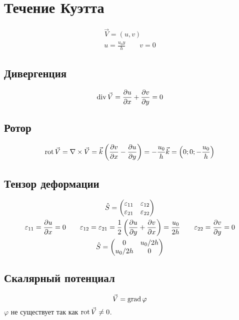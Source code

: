 \section{\texorpdfstring{Течение Куэтта}{Couette flow}}
\begin{gather*}
    \vec{V} = (u, v) \\
    u = \frac{u_0 y}{h} \qquad v = 0
\end{gather*}

\subsection{\texorpdfstring{Дивергенция}{Divergence}}
\[
    \operatorname{div}{\vec V} = \frac{\partial u}{\partial x} + \frac{\partial v}{\partial y} = 0
\]

\subsection{\texorpdfstring{Ротор}{Curl}}
\[
    \operatorname{rot}{\vec V} = \nabla \times \vec V = \vec k \left( \frac{\partial v}{\partial x} - \frac{\partial u}{\partial y} \right)
    = - \frac{u_0}{h} \vec k = \left(0; 0; -\frac{u_0}{h}\right)
\]

\subsection{\texorpdfstring{Тензор деформации}{Deformation tensor}}
\begin{gather*}
    \hat S =
    \begin{pmatrix}
        \varepsilon_{11} & \varepsilon_{12} \\
        \varepsilon_{21} & \varepsilon_{22}
    \end{pmatrix} \\
    \varepsilon_{11} = \frac{\partial u}{\partial x} = 0 \qquad
    \varepsilon_{12} = \varepsilon_{21} = \frac{1}{2} \left( \frac{\partial u}{\partial y} + \frac{\partial v}{\partial x} \right) = \frac{u_0}{2h}\qquad
    \varepsilon_{22} = \frac{\partial v}{\partial y} = 0 \\
    \hat S =
    \begin{pmatrix}
        0 & u_0/2h \\
        u_0/2h & 0
    \end{pmatrix} \\
\end{gather*}

\subsection{\texorpdfstring{Скалярный потенциал}{Scalar potential}}
\[
    \vec V = \operatorname{grad} \varphi
\]
$\varphi$ не существует так как $\operatorname{rot}{\vec V} \neq 0$.

